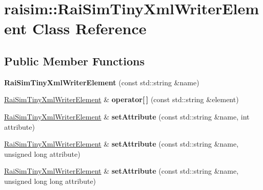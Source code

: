 \hypertarget{classraisim_1_1RaiSimTinyXmlWriterElement}{}\section{raisim\+:\+:Rai\+Sim\+Tiny\+Xml\+Writer\+Element Class Reference}
\label{classraisim_1_1RaiSimTinyXmlWriterElement}
\subsection*{Public Member Functions}
\begin{DoxyCompactItemize}
\item 
\mbox{\label{classraisim_1_1RaiSimTinyXmlWriterElement_a928c489d521e49eed45f4b2c1e68e50a}} 
{\bfseries Rai\+Sim\+Tiny\+Xml\+Writer\+Element} (const std\+::string \&name)
\item 
\mbox{\label{classraisim_1_1RaiSimTinyXmlWriterElement_a7bcc2fb4b8687710ba805185c4462221}} 
\hyperlink{classraisim_1_1RaiSimTinyXmlWriterElement}{Rai\+Sim\+Tiny\+Xml\+Writer\+Element} \& {\bfseries operator\mbox{[}$\,$\mbox{]}} (const std\+::string \&element)
\item 
\mbox{\label{classraisim_1_1RaiSimTinyXmlWriterElement_aa1e73f478b1ad866a62817c434917c93}} 
\hyperlink{classraisim_1_1RaiSimTinyXmlWriterElement}{Rai\+Sim\+Tiny\+Xml\+Writer\+Element} \& {\bfseries set\+Attribute} (const std\+::string \&name, int attribute)
\item 
\mbox{\label{classraisim_1_1RaiSimTinyXmlWriterElement_a94eaeda4af8c1326ba0521945dd688d5}} 
\hyperlink{classraisim_1_1RaiSimTinyXmlWriterElement}{Rai\+Sim\+Tiny\+Xml\+Writer\+Element} \& {\bfseries set\+Attribute} (const std\+::string \&name, unsigned long attribute)
\item 
\mbox{\label{classraisim_1_1RaiSimTinyXmlWriterElement_a09ee0a5605b81b633fc64933d17f4627}} 
\hyperlink{classraisim_1_1RaiSimTinyXmlWriterElement}{Rai\+Sim\+Tiny\+Xml\+Writer\+Element} \& {\bfseries set\+Attribute} (const std\+::string \&name, unsigned long long attribute)

\end{DoxyCompactItemize}
